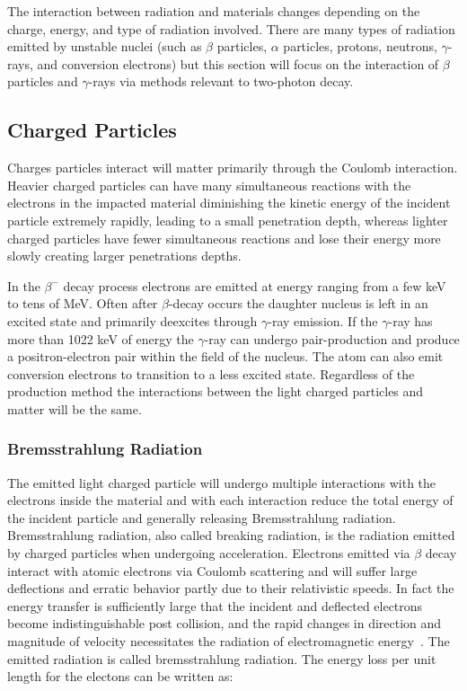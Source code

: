\documentclass[cnatzke_thesis_proposal.tex]{subfiles}
\begin{document}
The interaction between radiation and materials changes depending on the charge, energy, and type of radiation involved. There are many types of radiation emitted by unstable nuclei (such as $\beta$ particles, $\alpha$ particles, protons, neutrons, $\gamma$-rays, and conversion electrons) but this section will focus on the interaction of $\beta$ particles and $\gamma$-rays via methods relevant to two-photon decay.

\subsection{Charged Particles}
Charges particles interact will matter primarily through the Coulomb interaction. Heavier charged particles can have many simultaneous reactions with the electrons in the impacted material diminishing the kinetic energy of the incident particle extremely rapidly, leading to a small penetration depth, whereas lighter charged particles have fewer simultaneous reactions and lose their energy more slowly creating larger penetrations depths. 

In the $\beta^-$ decay process electrons are emitted at energy ranging from a few keV to tens of MeV. Often after $\beta$-decay occurs the daughter nucleus is left in an excited state and primarily deexcites through $\gamma$-ray emission. If the $\gamma$-ray has more than 1022 keV of energy the $\gamma$-ray can undergo pair-production and produce a positron-electron pair within the field of the nucleus. The atom can also emit conversion electrons to transition to a less excited state. Regardless of the production method the interactions between the light charged particles and matter will be the same.

\subsubsection{Bremsstrahlung Radiation}
\label{sec:bremsstrahlung_radiation}
The emitted light charged particle will undergo multiple interactions with the electrons inside the material and with each interaction reduce the total energy of the incident particle and generally releasing Bremsstrahlung radiation.
Bremsstrahlung radiation, also called breaking radiation, is the radiation emitted by charged particles when undergoing acceleration. 
Electrons emitted via $\beta$ decay interact with atomic electrons via Coulomb scattering and will suffer large deflections and erratic behavior partly due to their relativistic speeds.
In fact the energy transfer is sufficiently large that the incident and deflected electrons become indistinguishable post collision, and the rapid changes in direction and magnitude of velocity necessitates the radiation of electromagnetic energy~\cite{krane_introductory_1987}.
The emitted radiation is called bremsstrahlung radiation. 
The energy loss per unit length for the electons can be written as: 
\end{document}
